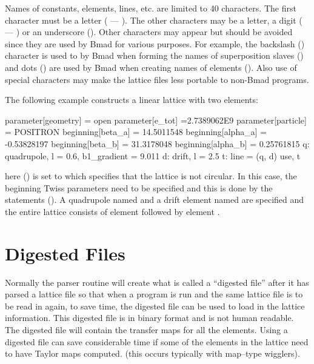 Names of constants, elements, lines, etc. are limited to 40
characters. The first character must be a letter ( --- ).
The other characters may be a letter, a digit ( --- ) or
an underscore (\vn{_}). Other characters may appear but should be avoided
since they are used by Bmad for various purposes. For example, the 
backslash (\vn{\B}) character is used to by Bmad when forming the names of
superposition slaves () and dots () are used by Bmad 
when creating names of  elements (). Also use of
special characters may make the lattice files less portable to non-Bmad programs.

The following example constructs a linear lattice with two elements: 
\begin{example}
  parameter[geometry] = open
  parameter[e_tot] =2.7389062E9
  parameter[particle] = POSITRON
  beginning[beta_a] = 14.5011548
  beginning[alpha_a] = -0.53828197
  beginning[beta_b] = 31.3178048
  beginning[alpha_b] = 0.25761815
  q: quadrupole, l = 0.6, b1_gradient = 9.011
  d: drift, l = 2.5
  t: line = (q, d)
  use, t 
\end{example}
here  () is set to 
which specifies that the lattice is not circular. In this case, the beginning 
Twiss parameters need to be specified and this is done by the 
statements (). A quadrupole named 
and a drift element named  are specified
and the entire lattice consists of element  followed by element .

\section{Digested Files}
\label{s:digested}

Normally the \bmad parser routine will create what is called a
``digested file'' after it has parsed a lattice file so that when a
program is run and the same lattice file is to be read in again, to save
time, the digested file can be used to load in the lattice information.
This digested file is in binary format and is not human readable. The
digested file will contain the transfer maps for all the elements. 
Using a digested file can save considerable time if some of the
elements in the lattice need to have Taylor maps computed.
(this occurs typically with map--type wigglers).

